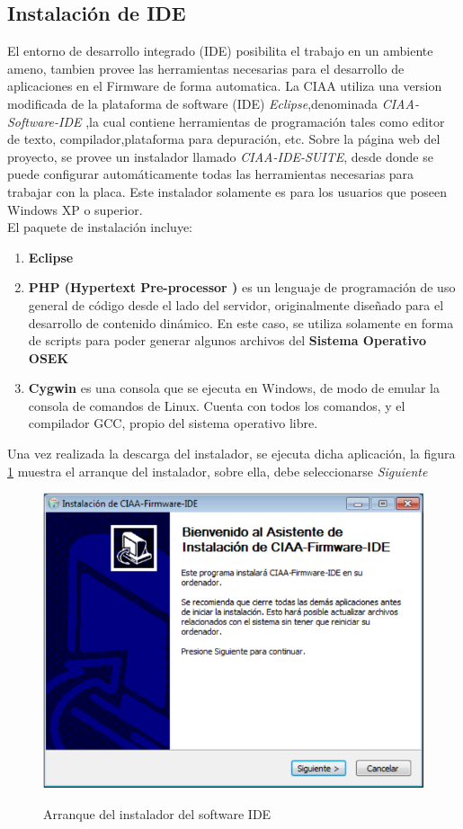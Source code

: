 \documentclass[12pt,letterpaper]{article}
\begin{document}
\subsection{Instalación de IDE}
El entorno de desarrollo integrado (IDE) posibilita el trabajo en un ambiente ameno, tambien provee las herramientas necesarias para el desarrollo de aplicaciones en el Firmware de forma automatica. La CIAA utiliza una version modificada de la plataforma de software (IDE)  \textit{Eclipse},denominada \textit{CIAA-Software-IDE} ,la cual contiene herramientas de programación tales como editor de texto, compilador,plataforma para depuración, etc.
Sobre la página web del proyecto, se provee un instalador llamado \textit{CIAA-IDE-SUITE}, desde donde se puede configurar automáticamente todas las herramientas necesarias para trabajar con la placa. Este instalador solamente es para los usuarios que poseen Windows XP o superior.\\
El paquete de instalación incluye:
\begin{enumerate}
\item \textbf{Eclipse}
\item\textbf{PHP (Hypertext Pre-processor )} es un lenguaje de programación de uso general de código desde el lado del servidor, originalmente diseñado para el desarrollo de contenido dinámico. En este caso, se utiliza solamente en forma de scripts para poder generar algunos archivos del \textbf{Sistema Operativo OSEK}
\item \textbf{Cygwin} es una consola que se ejecuta en Windows, de modo de emular la consola de comandos de Linux. Cuenta con todos los comandos, y el compilador GCC, propio del sistema operativo libre.
\end{enumerate}
Una vez realizada la descarga del instalador, se ejecuta dicha aplicación, la figura \ref{Fig4} muestra el arranque del instalador, sobre ella, debe seleccionarse \textit{Siguiente} 

\begin{figure}[!h]
\centering
\includegraphics[width=8 cm]{figuras/instalacion1.png}\\
\caption{Arranque del instalador del software IDE}
\label{Fig4}
\end{figure}
\end{document}
